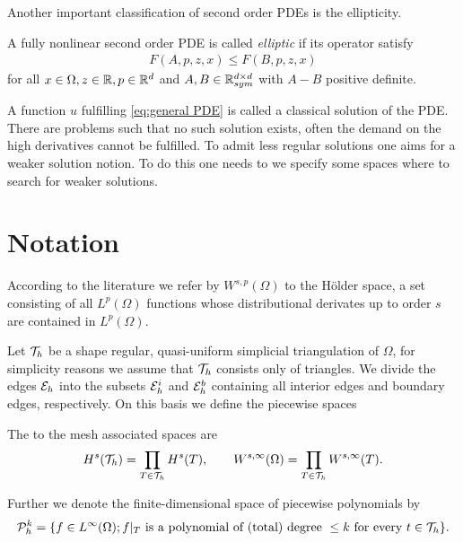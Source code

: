 Another important classification of second order PDEs is the ellipticity. 
\begin{definition}
	A fully nonlinear second order PDE is called \emph{elliptic} if its operator satisfy
	\begin{align}
		F(A,p,z,x) \leq F(B,p,z,x) \label{eq: ellipitic PDE}
	\end{align}
for all $x \in \Omega, z \in \mathbb{R}, p \in \mathbb{R}^d$ and $A,B \in \mathbb{R}^{d \times d}_{sym}$  with $A-B$ positive definite.
\end{definition}

A function $u$ fulfilling \eqref{eq:general PDE} is called a classical solution of the PDE. There are problems such that no such solution exists, often the demand on the high derivatives cannot be fulfilled. To admit less regular solutions one aims for a weaker solution notion. To do this one needs to we specify some spaces where to search for weaker solutions.

\section{Notation}
According to the literature we refer by $W^{s,p}(\Omega)$ to the H\"older space, a set consisting of all $L^p(\Omega)$ functions whose distributional derivates up to order $s$ are contained in $L^ p(\Omega)$.

Let $\mathcal{T}_h$ be a shape regular, quasi-uniform simplicial triangulation of $\Omega$, for simplicity reasons we assume that $\mathcal{T}_h$ consists only of triangles. We divide the edges $\mathcal{E}_h$ into the subsets $\mathcal{E}_h^i$ and $\mathcal{E}_h^b$ containing all interior edges and boundary edges, respectively. On this basis we define the piecewise spaces
\begin{definition}
The to the mesh associated spaces are
\begin{align}
	H^s(\mathcal{T}_h) = \prod\limits_{T\in \mathcal{T}_h}  H^s(T), \qquad W^{s,\infty}(\Omega) = \prod\limits_{T\in \mathcal{T}_h} W^{s,\infty}(T).
\end{align}	

\end{definition}
\begin{definition} \label{def: piecewise polySpace}
	Further we denote the finite-dimensional space of piecewise polynomials by
\[	
	\mathcal P^k_h = \{ f \in L^\infty(\Omega); f \arrowvert_T \textnormal{ is a polynomial of (total) degree } \leq k \textnormal{ for every } t \in \mathcal T_h\}.
\]
\end{definition}

